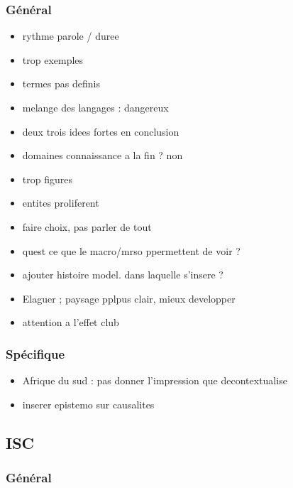 \documentclass[11pt]{article}
\begin{document}
\subsubsection*{Général}

\begin{itemize}
	\item rythme parole / duree
	\item trop exemples
	\item termes pas definis
	\item melange des langages : dangereux
	\item deux trois idees fortes en conclusion
	\item domaines connaissance a la fin ? non
	\item trop figures
	\item entites proliferent
	\item faire choix, pas parler de tout
	\item quest ce que le macro/mrso ppermettent de voir ?
	\item ajouter histoire model. dans laquelle s'insere ?
	\item Elaguer ; paysage pplpus clair, mieux developper
	\item attention a l'effet club
\end{itemize}

\subsubsection*{Spécifique}


\begin{itemize}
	\item Afrique du sud : pas donner l'impression que decontextualise
	\item inserer epistemo sur causalites
\end{itemize}





\subsection*{ISC}

\subsubsection*{Général}
\end{document}
